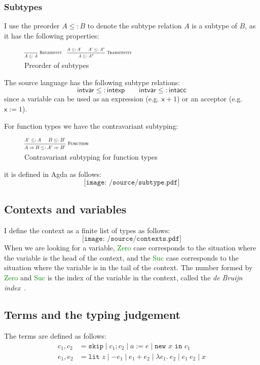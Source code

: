 \documentclass[12pt,a4paper]{report}
\theoremstyle{definition}
\newcommand{\gn}[1]{\textcolor{green}{#1}}
\newcommand{\gnt}[1]{\gn{\textsf{#1}}}
\begin{document}
        \subsubsection{Subtypes}
        I use the preorder $A ≤: B$ to denote the subtype relation $A$ is a subtype of $B$, as it has the following properties:
        \begin{figure}[H]
            \centering
            \includegraphics[width=0.5\textwidth]{subtype.pdf}
            \caption{Preorder of subtypes}
            \label{fig: subtype}
        \end{figure}

        The source language has the following subtype relations:
        \[ \textsf{intvar} \leq: \textsf{intexp} \qquad \textsf{intvar} \leq: \textsf{intacc} \]
        since a variable can be used as an expression (e.g. $\mathsf{x} + 1$) or an acceptor (e.g. $\mathsf{x} := 1$).

        For function types we have the contravariant subtyping:
        \begin{figure}[H]
            \centering
            \includegraphics[width=0.3\textwidth]{subtype_function.pdf}
            \caption{Contravariant subtyping for function types}
            \label{fig: subtype_fun}
        \end{figure}
        
        it is defined in Agda as follows:
        \[\texttt{[image: /source/subtype.pdf]}\]

        \subsection{Contexts and variables}
        I define the context as a finite list of types as follows:
        \[\texttt{[image: /source/contexts.pdf]}\]
        When we are looking for a variable, \gnt{Zero} case corresponds to the situation where the variable is the head of the context, and the \gnt{Suc} case corresponds to the situation where the variable is in the tail of the context. The number formed by \gnt{Zero} and \gnt{Suc} is the index of the variable in the context, called the \emph{de Bruijn index}~\autocite{de_bruijn}. 


        \subsection{Terms and the typing judgement} \label{subsec: terms}
        The terms are defined as follows:
        \[\begin{aligned}
            c_1, c_2 &= \texttt{skip} \mid c_1; c_2 \mid a := e \mid \texttt{new } x \texttt{ in } c_1 \\
            e_1, e_2 &= \texttt{lit } z \mid -e_1 \mid e_1 + e_2 \mid \lambda e_1.\ e_2 \mid e_1\ e_2 \mid x \\
        \end{aligned}\]
        
\end{document}
